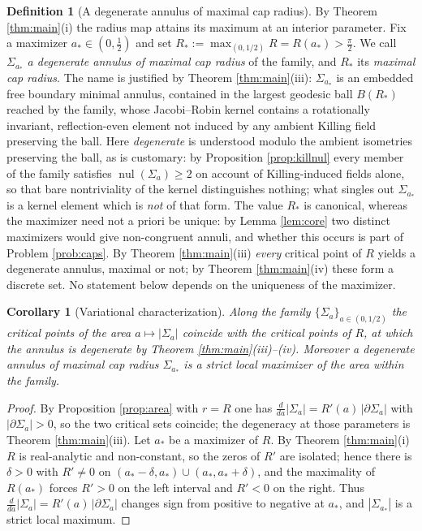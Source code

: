\documentclass[11pt,a4paper]{amsart}
\theoremstyle{plain}
\newtheorem{corollary}[theorem]{Corollary}
\theoremstyle{definition}
\newtheorem{definition}[theorem]{Definition}
\newcommand{\nul}{\operatorname{nul}}
\begin{document}
\begin{definition}[A degenerate annulus of maximal cap radius]\label{def:degannulus}
By Theorem \ref{thm:main}(i) the radius map attains its maximum at an interior parameter. Fix a maximizer $a_*\in(0,\tfrac12)$ and set $R_*:=\max_{(0,1/2)}R=R(a_*)>\tfrac\pi2$. We call $\Sigma_{a_*}$ \emph{a degenerate annulus of maximal cap radius} of the family, and $R_*$ its \emph{maximal cap radius}. The name is justified by Theorem \ref{thm:main}(iii): $\Sigma_{a_*}$ is an embedded free boundary minimal annulus, contained in the largest geodesic ball $B(R_*)$ reached by the family, whose Jacobi--Robin kernel contains a rotationally invariant, reflection-even element not induced by any ambient Killing field preserving the ball. Here \emph{degenerate} is understood modulo the ambient isometries preserving the ball, as is customary: by Proposition \ref{prop:killnul} every member of the family satisfies $\nul(\Sigma_a)\geq 2$ on account of Killing-induced fields alone, so that bare nontriviality of the kernel distinguishes nothing; what singles out $\Sigma_{a_*}$ is a kernel element which is \emph{not} of that form. The value $R_*$ is canonical, whereas the maximizer need not a priori be unique: by Lemma \ref{lem:core} two distinct maximizers would give non-congruent annuli, and whether this occurs is part of Problem \ref{prob:caps}. By Theorem \ref{thm:main}(iii) \emph{every} critical point of $R$ yields a degenerate annulus, maximal or not; by Theorem \ref{thm:main}(iv) these form a discrete set. No statement below depends on the uniqueness of the maximizer.
\end{definition}

\begin{corollary}[Variational characterization]\label{cor:areamax}
Along the family $\{\Sigma_a\}_{a\in(0,1/2)}$ the critical points of the area $a\mapsto|\Sigma_a|$ coincide with the critical points of $R$, at which the annulus is degenerate by Theorem \ref{thm:main}(iii)--(iv). Moreover a degenerate annulus of maximal cap radius $\Sigma_{a_*}$ is a strict local maximizer of the area within the family.
\end{corollary}

\begin{proof}
By Proposition \ref{prop:area} with $r=R$ one has $\frac{d}{da}|\Sigma_a|=R'(a)\,|\partial\Sigma_a|$ with $|\partial\Sigma_a|>0$, so the two critical sets coincide; the degeneracy at those parameters is Theorem \ref{thm:main}(iii). Let $a_*$ be a maximizer of $R$. By Theorem \ref{thm:main}(i) $R$ is real-analytic and non-constant, so the zeros of $R'$ are isolated; hence there is $\delta>0$ with $R'\neq 0$ on $(a_*-\delta,a_*)\cup(a_*,a_*+\delta)$, and the maximality of $R(a_*)$ forces $R'>0$ on the left interval and $R'<0$ on the right. Thus $\frac{d}{da}|\Sigma_a|=R'(a)\,|\partial\Sigma_a|$ changes sign from positive to negative at $a_*$, and $|\Sigma_{a_*}|$ is a strict local maximum.
\end{proof}
\end{document}
